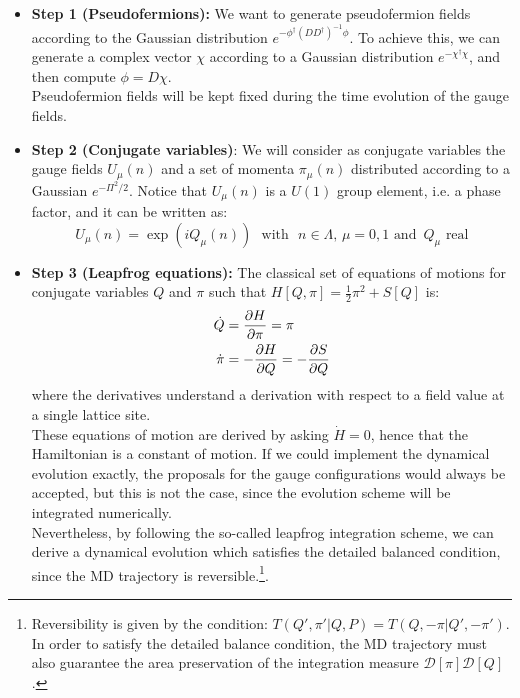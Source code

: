 \begin{itemize}
    \item \textbf{Step 1 (Pseudofermions):} We want to generate pseudofermion fields according to the Gaussian distribution $e^{- \phi^\dagger (D D^\dagger )^{-1} \phi}$. To achieve this, we can generate a complex vector $\chi$ according to a Gaussian distribution $e^{-\chi^\dagger\chi}$, and then compute $\phi = D\chi$.
    \\ Pseudofermion fields will be kept fixed during the time evolution of the gauge fields.
    \item \textbf{Step 2 (Conjugate variables)}: We will consider as conjugate variables the gauge fields $U_\mu(n)$ and a set of momenta $\pi_{\mu}(n)$ distributed according to a Gaussian $e^{-\Pi^2/2}$. Notice that $U_\mu(n)$ is a $U(1)$ group element, i.e. a phase factor, and it can be written as: 
    \begin{equation*}
        U_\mu(n) = \exp(iQ_\mu(n)) \,\,\,\,\mbox{with }\,\, n \in \Lambda, \, \mu = 0,1  \,\,\mbox{and}\,\,\,Q_\mu \,\,\mbox{real}
    \end{equation*}
    \item \textbf{Step 3 (Leapfrog equations):} The classical set of equations of motions for conjugate variables $Q$ and $\pi$ such that $H[Q, \pi] = \frac{1}{2} \pi^2 + S[Q]$ is:
    \begin{equation}\label{EOM}
    \begin{split}
        \dot{Q} &= \pdv{H}{\pi} = \pi \\
        \dot{\pi} &= -\pdv{H}{Q} = - \pdv{S}{Q}
    \end{split}
    \end{equation}
    where the derivatives understand a derivation with respect to a field value at a single lattice site.
    \\ These equations of motion are derived by asking $\Dot{H} = 0$, hence that the Hamiltonian is a constant of motion. If we could implement the dynamical evolution exactly, the proposals for the gauge configurations would always be accepted, but this is not the case, since the evolution scheme will be integrated numerically. 
   \\ Nevertheless, by following the so-called leapfrog integration scheme, we can derive a dynamical evolution which satisfies the detailed balanced condition, since the MD trajectory is reversible.\footnote{Reversibility is given by the condition: $T(Q', \pi'|Q, P) = T (Q, -\pi|Q', -\pi')$. In order to satisfy the detailed balance condition, the MD trajectory must also guarantee the area preservation of the integration measure $\mathcal{D}[\pi]\mathcal{D}[Q]$.}.

\end{itemize}

